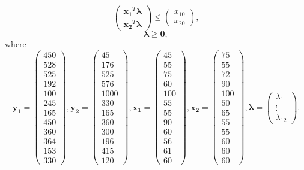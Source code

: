 \documentclass{article}
\begin{document}
$$
\begin{pmatrix}
  \boldsymbol{x_1}^T \boldsymbol{\lambda} \\
  \boldsymbol{x_2}^T \boldsymbol{\lambda}
\end{pmatrix}
\leq
\begin{pmatrix}
  x_{10} \\
  x_{20} 
\end{pmatrix},
$$
$$ \boldsymbol{\lambda} \geq \boldsymbol{0}, $$
where
$$
\boldsymbol{y_1} =
\begin{pmatrix}
  450 \\
  528 \\
  525 \\
  192 \\
  100 \\
  245 \\
  165 \\
  450 \\
  360 \\
  364 \\
  153 \\
  330 
\end{pmatrix}, 
\boldsymbol{y_2} =
\begin{pmatrix}
  45 \\
  176 \\
  525 \\
  576 \\
  1000 \\
  330 \\
  165 \\
  360 \\
  300 \\
  196 \\
  415 \\
  120
\end{pmatrix},
\boldsymbol{x_1} =
\begin{pmatrix}
  45 \\
  55 \\
  75 \\
  60 \\
  100 \\
  55 \\
  55 \\
  90 \\
  60 \\
  56 \\
  61 \\
  60
\end{pmatrix}, 
\boldsymbol{x_2} =
\begin{pmatrix}
  75 \\
  55 \\
  72 \\
  90 \\
  100 \\
  50 \\
  65 \\
  55 \\
  55 \\
  60 \\
  60 \\
  60
\end{pmatrix}, 
\boldsymbol{\lambda} = 
\begin{pmatrix}
  \lambda_1 \\
  \vdots \\
  \lambda_{12}
\end{pmatrix}.
$$
\end{document}
